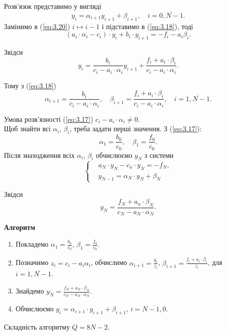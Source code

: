 Розв'язок представимо у вигляді
\begin{equation}
	\label{eq:3.20}
	y_i = \alpha_{i+1} y_{i+1} + \beta_{i+1}, \quad i = \overline{0, N-1}.
\end{equation}
Замінимо в (\ref{eq:3.20}) $i \mapsto i-1$ і підставимо в (\ref{eq:3.18}), тоді \[ (a_i \cdot\alpha_i - c_i) \cdot y_i + b_i \cdot y_{i+1} = - f_i - a_i \beta_i. \]

Звідси \[ y_i = \dfrac{b_i}{c_i - a_i\cdot \alpha_i} y_{i+1} + \dfrac{f_i + a_i \cdot \beta_i}{c_i - a_i \cdot \alpha_i}.\]

Тому з (\ref{eq:3.18}) \[ \alpha_{i+1} = \dfrac{b_i}{c_i - a_i \cdot \alpha_i}, \quad \beta_{i+1} = \dfrac{f_i + a_i \cdot \beta_i}{c_i - a_i \cdot \alpha_i}, \quad i = \overline{1, N-1}.\]

Умова розв'язності (\ref{eq:3.17}) $c_i - a_i \cdot \alpha_i \ne 0$. \\

Щоб знайти всі $\alpha_i$, $\beta_i$, треба задати перші значення. З (\ref{eq:3.17}):
\begin{equation}
	\label{eq:3.21}
	\alpha_1 = \dfrac{b_0}{c_0}, \quad \beta_1 = \dfrac{f_0}{c_0}.
\end{equation}
Після знаходження всіх $\alpha_i$, $\beta_i$ обчислюємо $y_N$ з системи
\[ \left\{ \begin{aligned} & a_N \cdot y_N - c_n \cdot y_N = - f_N, \\ & y_{N-1} = \alpha_N \cdot y_N + \beta_N \end{aligned} \right. \]

Звідси
\begin{equation}
	\label{eq:3.22}
	y_N = \dfrac{f_N + a_n \cdot \beta_N}{c_N - a_N \cdot \alpha_N}.
\end{equation}

\textbf{Алгоритм}
\begin{enumerate}
	\item Покладемо $\alpha_1 = \frac{b_0}{c_0}$, $\beta_1 = \frac{f_0}{c_0}$.

	\item Позначимо $z_i = c_i - a_i \alpha_i$, обчислимо $\alpha_{i+1} = \frac{b_i}{z_i}$, $\beta_{i+1} = \frac{f_i+a_i\cdot\beta_i}{z_i}$, для $i=\overline{1,N-1}$.

	\item Знайдемо $y_N = \frac{f_N + a_N\cdot\beta_N}{c_N - a_N\cdot\alpha_N}$.

	\item Обчислюємо $y_i = \alpha_{i+1}\cdot y_{i+1} + \beta_{i+1}$, $i=\overline{N-1,0}$.
\end{enumerate}
Складність алгоритму $Q = 8N - 2$. \\

